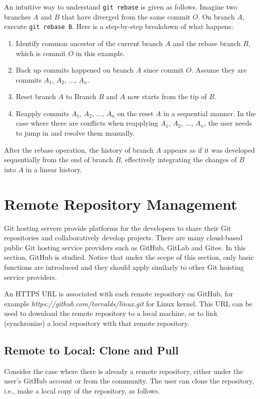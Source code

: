An intuitive way to understand \verb|git rebase| is given as follows. Imagine two branches $A$ and $B$ that have diverged from the same commit $O$. On branch $A$, execute \verb|git rebase B|. Here is a step-by-step breakdown of what happens:
\begin{enumerate}
	\item Identify common ancestor of the current branch $A$ and the rebase branch $B$, which is commit $O$ in this example.
	\item Back up commits happened on branch $A$ since commit $O$. Assume they are commits $A_1$, $A_2$, ..., $A_n$.
	\item Reset branch $A$ to Branch $B$ and $A$ now starts from the tip of $B$.
	\item Reapply commits $A_1$, $A_2$, ..., $A_n$ on the reset $A$ in a sequential manner. In the case where there are conflicts when reapplying $A_1$, $A_2$, ..., $A_n$, the user needs to jump in and resolve them manually.
\end{enumerate}
After the rebase operation, the history of branch $A$ appears as if it was developed sequentially from the end of branch $B$, effectively integrating the changes of $B$ into $A$ in a linear history.

\section{Remote Repository Management} \label{ch:sma:sec:rrm}

Git hosting servers provide platforms for the developers to share their Git repositories and collaboratively develop projects. There are many cloud-based public Git hosting service providers such as GitHub, GitLab and Gitee. In this section, GitHub is studied. Notice that under the scope of this section, only basic functions are introduced and they should apply similarly to other Git hoisting service providers.   

An HTTPS URL is associated with each remote repository on GitHub, for example \textit{https://github.com/torvalds/linux.git} for Linux kernel. This URL can be used to download the remote repository to a local machine, or to link (synchronize) a local repository with that remote repository.

\subsection{Remote to Local: Clone and Pull}

Consider the case where there is already a remote repository, either under the user's GitHub account or from the community. The user can clone the repository, i.e., make a local copy of the repository, as follows.

